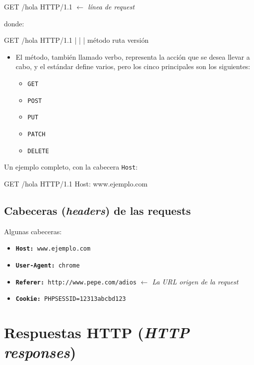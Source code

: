 \documentclass[a4paper,11pt]{memoir}
\begin{document}
\begin{codigo}
GET /hola HTTP/1.1          \emph{\(\leftarrow\) línea de request}
\end{codigo}

donde:

\begin{codigo}
GET     /hola   HTTP/1.1
|       |       |
método  ruta    versión
\end{codigo}

\begin{itemize}
    \item El método, también llamado verbo, representa la acción que se desea
    llevar a cabo, y el estándar define varios, pero los cinco principales
    son los siguientes:

    \begin{itemize}
        \item \texttt{GET}
        \item \texttt{POST}
        \item \texttt{PUT}
        \item \texttt{PATCH}
        \item \texttt{DELETE}
    \end{itemize}
\end{itemize}

Un ejemplo completo, con la cabecera \texttt{Host}:
\begin{codigo}
GET /hola HTTP/1.1
Host: www.ejemplo.com
\end{codigo}

\subsection{Cabeceras (\emph{headers}) de las requests}

Algunas cabeceras:
\begin{itemize}
    \item \texttt{\textbf{Host:}}\texttt{ www.ejemplo.com}
    \item \texttt{\textbf{User-Agent:}}\texttt{ chrome}
    \item \texttt{\textbf{Referer:}}\texttt{ http://www.pepe.com/adios} \emph{$\leftarrow$
        La URL origen de la request}
    \item \texttt{\textbf{Cookie:}}\texttt{ PHPSESSID=12313abcbd123}
\end{itemize}

\section{Respuestas HTTP (\emph{HTTP responses})}
\end{document}
